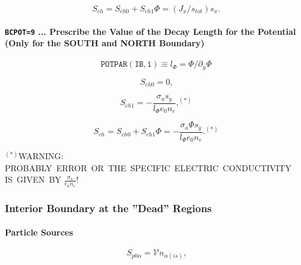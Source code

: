 \documentclass[11pt]{article}
\begin{document}
\begin{equation}
S_{ch}=S_{ch0}+S_{ch1}\Phi=\left( J_{x}/s_{tot}\right) s_{x}\text{.} 
\label{c344}
\end{equation}

\bigskip

\paragraph{\texttt{BCPOT=9} ... Prescribe the Value of the Decay Length for
the Potential (Only for the SOUTH and NORTH Boundary)}

\bigskip

\begin{equation*}
\mathtt{POTPAR(IB,1)}\equiv l_{\Phi}=\Phi/\partial_{y}\Phi 
\end{equation*}

\bigskip

\begin{equation}
S_{ch0}=0\text{,}   \label{c345}
\end{equation}

\begin{equation}
S_{ch1}=-\frac{\sigma_{a}s_{y}}{l_{\Phi}e_{0}n_{e}}\text{,}^{\left(
\ast\right) }   \label{c346}
\end{equation}

\begin{equation}
S_{ch}=S_{ch0}+S_{ch1}\Phi=-\frac{\sigma_{a}\Phi s_{y}}{l_{\Phi}e_{0}n_{e}}%
\text{.}^{\left( \ast\right) }   \label{c347}
\end{equation}

\bigskip

$^{\left( \ast\right) }$WARNING: PROBABLY\ ERROR\ OR\ THE\ SPECIFIC\
ELECTRIC\ CONDUCTIVITY IS\ GIVEN\ BY $\frac{\sigma_{a}}{e_{0}n_{e}}$!

\bigskip

\bigskip

\subsubsection{Interior Boundary at the ''Dead'' Regions}

\bigskip

\paragraph{Particle Sources}

\bigskip

\begin{equation}
S_{p0\alpha}=\mathcal{V}n_{\alpha\left( is\right) }\text{,}   \label{c348}
\end{equation}
\end{document}
